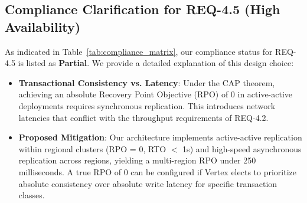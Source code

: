 \subsection{Compliance Clarification for REQ-4.5 (High Availability)}
As indicated in Table~\ref{tab:compliance_matrix}, our compliance status for REQ-4.5 is listed as \textbf{Partial}. We provide a detailed explanation of this design choice:
\begin{itemize}
  \item \textbf{Transactional Consistency vs. Latency}: Under the CAP theorem, achieving an absolute Recovery Point Objective (RPO) of 0 in active-active deployments requires synchronous replication. This introduces network latencies that conflict with the throughput requirements of REQ-4.2.
  \item \textbf{Proposed Mitigation}: Our architecture implements active-active replication within regional clusters (RPO = 0, RTO $<$ 1s) and high-speed asynchronous replication across regions, yielding a multi-region RPO under 250 milliseconds. A true RPO of 0 can be configured if Vertex elects to prioritize absolute consistency over absolute write latency for specific transaction classes.
\end{itemize}
